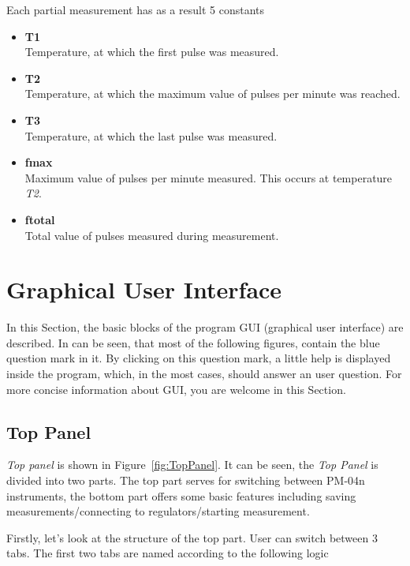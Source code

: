 \documentclass[a4paper,11pt,twoside]{book}
\theoremstyle{named}
\begin{document}
Each partial measurement has as a result 5 constants

\begin{itemize}
  \item \textbf{T1} \\
    Temperature, at which the first pulse was measured.
  \item \textbf{T2} \\
    Temperature, at which the maximum value of pulses per minute was reached.
  \item \textbf{T3} \\
    Temperature, at which the last pulse was measured.
  \item \textbf{fmax} \\
    Maximum value of pulses per minute measured. This occurs at temperature
    \textit{T2}.
  \item \textbf{ftotal} \\
    Total value of pulses measured during measurement. 
\end{itemize}

\section{Graphical User Interface}

In this Section, the basic blocks of the program GUI (graphical user interface)
are described. In can be seen, that most of the following figures, contain the
blue question mark in it. By clicking on this question mark, a little help is
displayed inside the program, which, in the most cases, should answer an user
question. For more concise information about GUI, you are welcome in this
Section. 

\subsection{Top Panel}
\label{sec:TopPanel}

\textit{Top panel} is shown in Figure~\ref{fig:TopPanel}. It can be seen, the
\textit{Top Panel} is divided into two parts. The top part serves for switching
between PM-04n instruments, the bottom part offers some basic features including
saving measurements/connecting to regulators/starting measurement.

Firstly, let's look at the structure of the top part. User can switch between 3
tabs. The first two tabs are named according to the following logic
\end{document}
